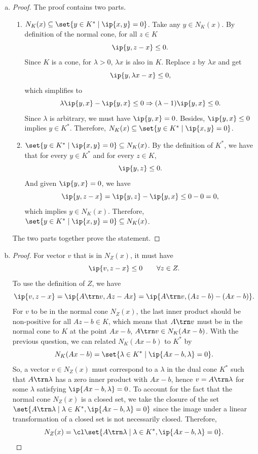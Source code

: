 \documentclass{article}
\theoremstyle{plain}
\theoremstyle{definition}
\theoremstyle{remark}
\begin{document}
\begin{solution}
\begin{enumerate}[(a)]
{\begin{proof}
                Let $y$ be any feasible directions in $F_K(x)$. By definition, for all small $t>0$, $x+ty\in K$. By the convexity of $K$, the line segment connecting $x$ and $x+ty$ must entirely lie in $K$. For a sufficiently small $t$, this implies that $y$ can be represented as \[y=\frac{1}{t}(x+ty)-\frac{1}{t}x\Rightarrow(x+ty)-x=z-x,\] where $z=x+ty\in K$. We can set $\alpha=1$ to match the form required. So, $y=z-\alpha x$ with $x\in K$ and $\alpha=1\geq 0$.
            \end{proof}
        }
        \item {
            \begin{proof}
                The proof contains two parts.
                \begin{enumerate}
                    \item $N_K(x)\subseteq\set{y\in K^*\mid \ip{x,y}=0}$. Take any $y\in N_K(x)$. By definition of the normal cone, for all $z\in K$ \[\ip{y, z-x}\leq 0.\] Since $K$ is a cone, for $\lambda>0$, $\lambda x$ is also in $K$. Replace $z$  by $\lambda x$ and get \[\ip{y, \lambda x-x}\leq 0,\] which simplifies to \[\lambda\ip{y,x}-\ip{y,x}\leq 0 \Rightarrow (\lambda-1)\ip{y, x}\leq 0.\] Since $\lambda$ is arbitrary, we must have $\ip{y, x}=0$. Besides, $\ip{y,x}\leq 0$ implies $y\in K^*$. Therefore, $N_K(x)\subseteq\set{y\in K^*\mid \ip{x,y}=0}$.
                    \item $\set{y\in K^*\mid \ip{x,y}=0}\subseteq N_K(x)$. By the definition of $K^*$, we have that for every $y\in K^*$ and for every $z\in K$, \[\ip{y,z}\leq 0.\] And given $\ip{y, x}=0$, we have \[\ip{y, z-x}=\ip{y, z}-\ip{y, x}\leq 0-0 =0,\] which implies $y\in N_K(x)$. Therefore, $\set{y\in K^*\mid \ip{x,y}=0}\subseteq N_K(x)$.
                \end{enumerate}
                The two parts together prove the statement.
            \end{proof}
        }
        \item {
            \begin{proof}
                For vector $v$ that is in $N_Z(x)$, it must have \[\ip{v, z-x}\leq 0 \qquad \forall z\in Z.\] To use the definition of $Z$, we have \[\ip{v, z-x}=\ip{A\trn v,Az-Ax}=\ip{A\trn v, (Az-b)-(Ax-b)}.\] For $v$ to be in the normal cone $N_Z(x)$, the last inner product should be non-positive for all $Az-b\in K$, which means that $A\trn v$ must be in the normal cone to $K$ at the point $Ax-b$, \ie $A\trn v\in N_K(Ax-b)$. With the previous question, we can related $N_K(Ax-b)$ to $K^*$ by \[N_K(Ax-b)=\set{\lambda\in K^*\mid \ip{Ax-b, \lambda}=0}.\] So, a vector $v\in N_Z(x)$ must correspond to a $\lambda$ in the dual cone $K^*$ such that $A\trn\lambda$ has a zero inner product with $Ax-b$, hence $v=A\trn\lambda$ for some $\lambda$ satisfying $\ip{Ax-b, \lambda}=0$. To account for the fact that the normal cone $N_Z(x)$ is a closed set, we take the closure of the set $\set{A\trn\lambda\mid\lambda\in K^*,\ip{Ax-b,\lambda}=0}$ since the image under a linear transformation of a closed set is not necessarily closed. Therefore, \[N_Z(x)=\cl\set{A\trn\lambda\mid\lambda\in K^*,\ip{Ax-b,\lambda}=0}.\]

\end{proof}}
\end{enumerate}
\end{solution}
\end{document}
